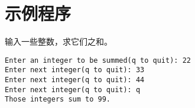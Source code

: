 \section{示例程序}

\begin{frame}\ft{\secname}
  \begin{biancheng}
    输入一些整数，求它们之和。
  \end{biancheng}
\end{frame}

\begin{frame}\ft{\secname}

\end{frame}



\begin{frame}[fragile]\ft{\secname}
\begin{lstlisting}[backgroundcolor=\color{red!10}]
Enter an integer to be summed(q to quit): 22
Enter next integer(q to quit): 33
Enter next integer(q to quit): 44
Enter next integer(q to quit): q
Those integers sum to 99.
\end{lstlisting}
\end{frame}

